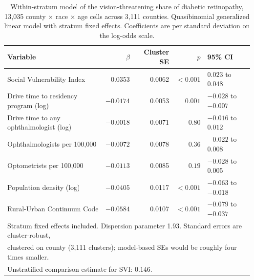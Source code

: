 \documentclass[11pt]{article}
\begin{document}
\begin{table}[htbp]
\centering
\caption{Within-stratum model of the vision-threatening share of diabetic
retinopathy, 13,035 county $\times$ race $\times$ age cells across 3,111
counties. Quasibinomial generalized linear model with stratum fixed effects.
Coefficients are per standard deviation on the log-odds scale.}
\label{tab:main}
\begin{tabular}{lrrrl}
\toprule
Variable & $\beta$ & Cluster SE & $p$ & 95\% CI \\
\midrule
Social Vulnerability Index             & $0.0353$  & 0.0062 & $<0.001$ & $0.023$ to $0.048$ \\
Drive time to residency program (log)  & $-0.0174$ & 0.0053 & $0.001$  & $-0.028$ to $-0.007$ \\
Drive time to any ophthalmologist (log)& $-0.0018$ & 0.0071 & $0.80$   & $-0.016$ to $0.012$ \\
Ophthalmologists per 100,000           & $-0.0072$ & 0.0078 & $0.36$   & $-0.022$ to $0.008$ \\
Optometrists per 100,000               & $-0.0113$ & 0.0085 & $0.19$   & $-0.028$ to $0.005$ \\
Population density (log)               & $-0.0405$ & 0.0117 & $<0.001$ & $-0.063$ to $-0.018$ \\
Rural-Urban Continuum Code             & $-0.0584$ & 0.0107 & $<0.001$ & $-0.079$ to $-0.037$ \\
\midrule
\multicolumn{5}{l}{\footnotesize Stratum fixed effects included. Dispersion
parameter 1.93. Standard errors are cluster-robust,}\\
\multicolumn{5}{l}{\footnotesize clustered on county (3,111 clusters); model-based
SEs would be roughly four times smaller.}\\
\multicolumn{5}{l}{\footnotesize Unstratified comparison estimate for SVI:
$0.146$.}\\
\bottomrule
\end{tabular}
\end{table}
\end{document}

